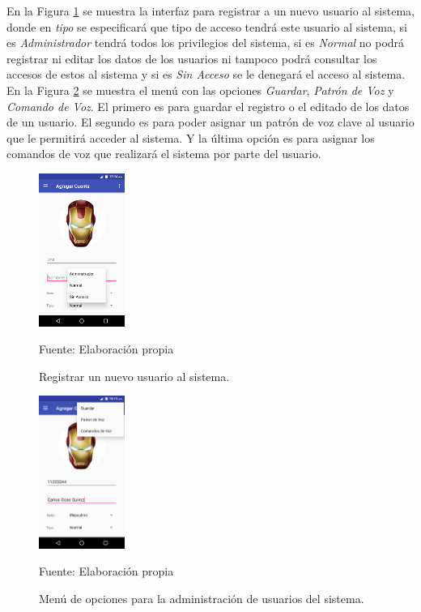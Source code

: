 \vskip -0.5cm
En la Figura \ref{fig:figura3.41} se muestra la interfaz para registrar a un nuevo usuario al sistema, donde en \textit{tipo} se especificará que tipo de acceso tendrá este usuario al sistema, si es \textit{Administrador} tendrá todos los privilegios del sistema, si es \textit{Normal} no podrá registrar ni editar los datos de los usuarios ni tampoco podrá consultar los accesos de estos al sistema y si es \textit{Sin Acceso} se le denegará el acceso al sistema.
\vskip 0.5cm
En la Figura \ref{fig:figura3.42} se muestra el menú con las opciones \textit{Guardar}, \textit{Patrón de Voz} y \textit{Comando de Voz}. El primero es para guardar el registro o el editado de los datos de un usuario. El segundo es para poder asignar un patrón de voz clave al usuario que le permitirá acceder al sistema. Y la última opción es para asignar los comandos de voz que realizará el sistema por parte del usuario.
\begin{figure}[H]
\captionsetup{justification=centering}
\begin{center}
\includegraphics[width=0.25\textwidth]{Imagenes/Cap3/image041}
\end{center}
\begin{center}
\vskip -0.5cm
\caption{\small{Registrar un nuevo usuario al sistema.}}
\label{fig:figura3.41}
{\small{Fuente: Elaboración propia}}
\end{center}
\end{figure}
\vskip -0.5cm
\begin{figure}[H]
\captionsetup{justification=centering}
\begin{center}
\includegraphics[width=0.25\textwidth]{Imagenes/Cap3/image042}
\end{center}
\begin{center}
\vskip -0.5cm
\caption{\small{Menú de opciones para la administración de usuarios del sistema.}}
\label{fig:figura3.42}
{\small{Fuente: Elaboración propia}}
\end{center}
\end{figure}
